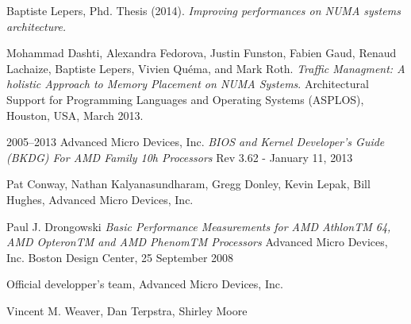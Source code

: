 \begin{thebibliography}{99}

   Baptiste Lepers, Phd. Thesis (2014).
    \newblock \textit{Improving performances on NUMA systems architecture.}
  
   Mohammad Dashti, Alexandra Fedorova, Justin Funston,
    Fabien Gaud, Renaud Lachaize, Baptiste Lepers, Vivien Quéma, and Mark
    Roth.
    \newblock \textit{Traffic Managment: A holistic Approach to Memory
      Placement on NUMA Systems}.
    \newblock Architectural Support for Programming Languages and Operating
    Systems (ASPLOS), Houston, USA, March 2013.

   2005–2013 Advanced Micro Devices, Inc.
  	\newblock \textit{BIOS and Kernel Developer’s Guide (BKDG) For AMD Family 10h Processors}
  	Rev 3.62  - January 11, 2013

  Pat Conway, Nathan Kalyanasundharam, Gregg Donley, Kevin Lepak, Bill Hughes, Advanced Micro Devices, Inc.

  Paul J. Drongowski
  	\newblock \textit{Basic Performance Measurements for AMD AthlonTM 64, AMD OpteronTM and AMD PhenomTM Processors}
  	Advanced Micro Devices, Inc. Boston Design Center, 25 September 2008

  Official developper's team, Advanced Micro Devices, Inc.

  Vincent M. Weaver, Dan Terpstra, Shirley Moore

  


\end{thebibliography}
